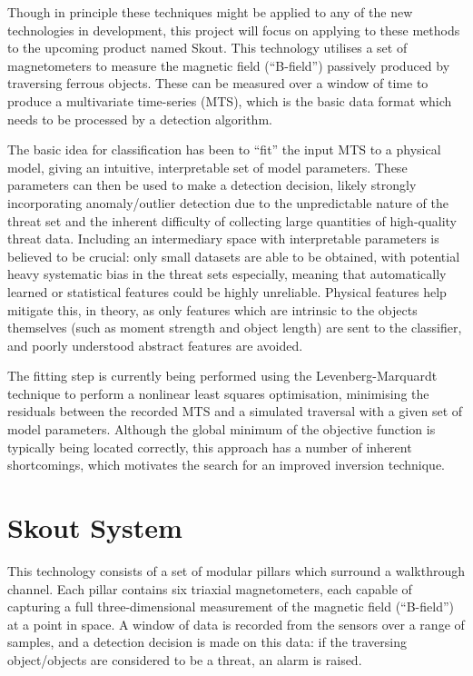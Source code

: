 \documentclass[10pt, a4paper, twocolumn]{article} %
\begin{document}
Though in principle these techniques might be applied to any of the new technologies in development, this project will focus on applying to these methods to the upcoming product named Skout. This technology utilises a set of magnetometers to measure the magnetic field (“B-field”) passively produced by traversing ferrous objects. These can be measured over a window of time to produce a multivariate time-series (MTS), which is the basic data format which needs to be processed by a detection algorithm.

The basic idea for classification has been to “fit” the input MTS to a physical model, giving an intuitive, interpretable set of model parameters. These parameters can then be used to make a detection decision, likely strongly incorporating anomaly/outlier detection due to the unpredictable nature of the threat set and the inherent difficulty of collecting large quantities of high-quality threat data. Including an intermediary space with interpretable parameters is believed to be crucial: only small datasets are able to be obtained, with potential heavy systematic bias in the threat sets especially, meaning that automatically learned or statistical features could be highly unreliable. Physical features help mitigate this, in theory, as only features which are intrinsic to the objects themselves (such as moment strength and object length) are sent to the classifier, and poorly understood abstract features are avoided.

The fitting step is currently being performed using the Levenberg-Marquardt technique to perform a nonlinear least squares optimisation, minimising the residuals between the recorded MTS and a simulated traversal with a given set of model parameters. Although the global minimum of the objective function is typically being located correctly, this approach has a number of inherent shortcomings, which motivates the search for an improved inversion technique.



\section{Skout System}

This technology consists of a set of modular pillars which surround a walkthrough channel. Each pillar contains six triaxial magnetometers, each capable of capturing a full three-dimensional measurement of the magnetic field (“B-field”) at a point in space. A window of data is recorded from the sensors over a range of samples, and a detection decision is made on this data: if the traversing object/objects are considered to be a threat, an alarm is raised.
\end{document}
